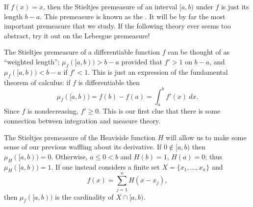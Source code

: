 \begin{example}
If $f(x) = x$, then the Stieltjes premeasure of an interval $[a, b)$ under $f$ is just its length $b - a$.
This premeasure is known as the .
It will be by far the most important premeasure that we study.
If the following theory ever seems too abstract, try it out on the Lebesgue premeasure!
\end{example}

\begin{example}
The Stieltjes premeasure of a differentiable function $f$ can be thought of as ``weighted length''; $\mu_f([a, b)) > b - a$ provided that $f' > 1$ on $b - a$, and $\mu_f([a, b)) < b - a$ if $f' < 1$.
This is just an expression of the fundamental theorem of calculus: if $f$ is differentiable then
\[\mu_f([a, b)) = f(b) - f(a) = \int_{a}^{b} f'(x)~dx.\]
Since $f$ is nondecreasing, $f' \geq 0$.
This is our first clue that there is some connection between integration and measure theory.
\end{example}

\begin{example}
The Stieltjes premeasure of the Heaviside function $H$ will allow us to make some sense of our previous waffling about its derivative.
If $0 \notin [a, b)$ then $\mu_H([a, b)) = 0$.
Otherwise, $a \leq 0 < b$ and $H(b) = 1$, $H(a) = 0$; thus $\mu_H([a, b)) = 1$.
If one instead considers a finite set $X = \{x_1, \dots, x_{n}\}$ and
\[f(x) = \sum_{j=1}^{n} H(x - x_{j}),\]
then $\mu_f([a, b))$ is the cardinality of $X \cap [a, b)$.
\end{example}

